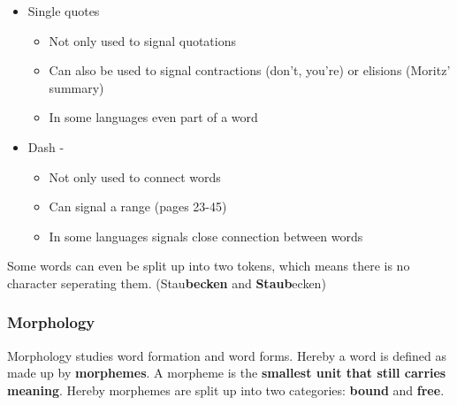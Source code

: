\documentclass[
../../NLP4W_Summary.tex,
]
{subfiles}
\begin{document}
\begin{defbox}
\begin{itemize}
        \item Single quotes
        \begin{itemize}
            \item Not only used to signal quotations
            \item Can also be used to signal contractions (don't, you're) or elisions (Moritz' summary)
            \item In some languages even part of a word
        \end{itemize}
        \item Dash -
        \begin{itemize}
            \item Not only used to connect words
            \item Can signal a range (pages 23-45)
            \item In some languages signals close connection between words
        \end{itemize}
    \end{itemize}
\end{defbox}

Some words can even be split up into two tokens, which means there is no character seperating them. (Stau\textbf{becken} and \textbf{Staub}ecken)

\newpage
\subsubsection{Morphology}
Morphology studies word formation and word forms. Hereby a word is defined as made up by \textbf{morphemes}. A morpheme is the \textbf{smallest unit that still carries meaning}.
Hereby morphemes are split up into two categories: \textbf{bound} and \textbf{free}. 
\end{document}
